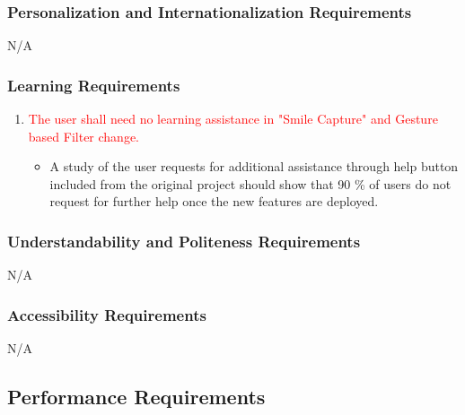 \documentclass[12pt, titlepage]{article}
\begin{document}
\subsubsection{Personalization and Internationalization Requirements}
{\color{red}N/A}


\subsubsection{Learning Requirements}
\begin{enumerate}[{LR}1.]
	\item \textcolor{red}{The user shall need no learning assistance in "Smile Capture" and Gesture based Filter change.}
	\begin{itemize}
		\item {\color{red}A study of the user requests for additional assistance through help button included from the original project should show that 90 \% of users do not request for further help once the new features are deployed. }
	\end{itemize}
\end{enumerate}

\subsubsection{Understandability and Politeness Requirements}
{\color{red}N/A}

\subsubsection{Accessibility Requirements}
{\color{red}N/A}

\subsection{Performance Requirements}
\end{document}
